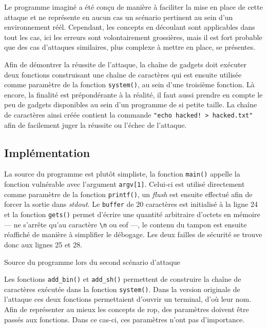 Le programme imaginé a été conçu de manière à faciliter la mise en place de cette
attaque et ne représente en aucun cas un scénario pertinent au sein d'un environnement
réél. Cependant, les concepts en découlant sont applicables dans tout les cas, ici les
erreurs sont volontairement grossières, mais il est fort probable que des cas
d'attaques similaires, plus complexe à mettre en place, se présentes.

Afin de démontrer la réussite de l'attaque, la chaîne de gadgets doit exécuter deux
fonctions construisant une chaîne de caractères qui est ensuite utilisée comme
paramètre de la fonction \texttt{system()}, au sein d'une troisième fonction. Là
encore, la finalité est prépondérante à la réalité, il faut aussi prendre en compte le
peu de gadgets disponibles au sein d'un programme de si petite taille. La chaîne de
caractères ainsi créée contient la commande \texttt{"echo hacked! > hacked.txt"} afin
de facilement juger la réussite ou l'échec de l'attaque.


\subsection{Implémentation}

La source du programme est plutôt simpliste, la fonction \texttt{main()} appelle la
fonction vulnérable avec l'argument \texttt{argv[1]}. Celui-ci est utilisé directement
comme paramètre de la fonction \texttt{printf()}, un \textit{flush} est ensuite
effectué afin de forcer la sortie dans \textit{stdout}. Le \texttt{buffer} de 20
caractères est initialisé à la ligne 24 et la fonction \texttt{gets()} permet d'écrire
une quantité arbitraire d'octets en mémoire --- ne s'arrête qu'au caractère
\texttt{\textbackslash n} ou \gls{eof} ---, le contenu du tampon est ensuite réaffiché
de manière à simplifier le débogage. Les deux failles de sécurité se trouve donc aux
lignes 25 et 28.

\begin{listing}
	\caption{Source du programme lors du second scénario d'attaque}
	\label{lst:rop2}
\end{listing}

Les fonctions \texttt{add\_bin()} et \texttt{add\_sh()} permettent de construire la
chaîne de caractères exécutée dans la fonction \texttt{system()}. Dans la version
originale de l'attaque ces deux fonctions permettaient d'ouvrir un terminal, d'où leur
nom. Afin de représenter au mieux les concepts de \gls{rop}, des paramètres doivent
être passés aux fonctions. Dans ce cas-ci, ces paramètres n'ont pas d'importance.

